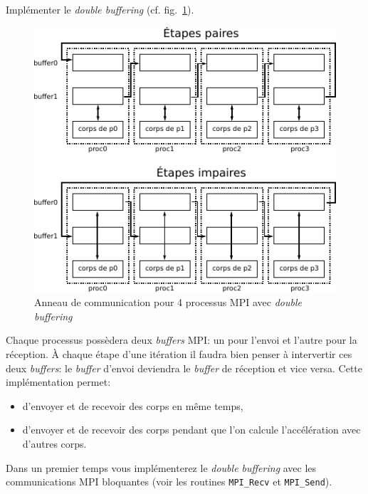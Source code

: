 \begin{questions}
	\question Implémenter le \textit{double buffering} (cf. fig.~\ref{fig:anneauDB}).
	\begin{figure}[htbp]
		\centering
		\includegraphics[width=0.65\linewidth]{schemas/anneau_avec_buffering.pdf}
		\caption{Anneau de communication pour 4 processus MPI avec \textit{double buffering}}
		\label{fig:anneauDB}
	\end{figure}
	\begin{solution}
		Chaque processus possèdera deux \textit{buffers} MPI: un pour l'envoi et l'autre pour la réception.
		À chaque étape d'une itération il faudra bien penser à intervertir ces deux \textit{buffers}: le \textit{buffer} d'envoi deviendra le \textit{buffer} de réception et vice versa.
		Cette implémentation permet:
		\begin{itemize}
			\item d'envoyer et de recevoir des corps en même temps,
			\item d'envoyer et de recevoir des corps pendant que l'on calcule l'accélération avec d'autres corps.
		\end{itemize}
		Dans un premier temps vous implémenterez le \textit{double buffering} avec les communications MPI bloquantes (voir les routines \texttt{MPI\_Recv} et \texttt{MPI\_Send}).
	\end{solution}


\end{questions}
